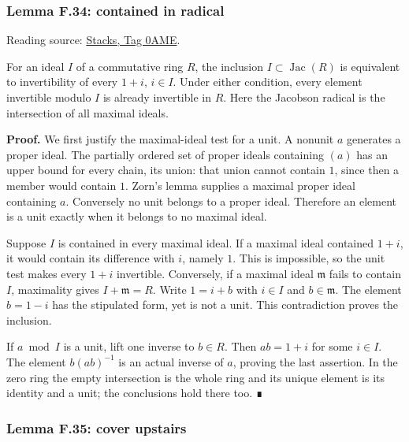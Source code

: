 \documentclass[11pt,a4paper,openany]{report}
\begin{document}
\label{AG-RG-S05-algebra-lemma-contained-in-radical}

\subsubsection{Lemma F.34: contained in radical}\label{AG-RG-S05-lemma-f.34-contained-in-radical}

Reading source: \href{https://stacks.math.columbia.edu/tag/0AME}{Stacks, Tag 0AME}.

For an ideal \(I\) of a commutative ring \(R\), the inclusion \(I\subset\operatorname{Jac}(R)\) is equivalent to invertibility of every \(1+i\), \(i\in I\). Under either condition, every element invertible modulo \(I\) is already invertible in \(R\). Here the Jacobson radical is the intersection of all maximal ideals.

\textbf{Proof.} We first justify the maximal-ideal test for a unit. A nonunit \(a\) generates a proper ideal. The partially ordered set of proper ideals containing \((a)\) has an upper bound for every chain, its union: that union cannot contain \(1\), since then a member would contain \(1\). Zorn's lemma supplies a maximal proper ideal containing \(a\). Conversely no unit belongs to a proper ideal. Therefore an element is a unit exactly when it belongs to no maximal ideal.

Suppose \(I\) is contained in every maximal ideal. If a maximal ideal contained \(1+i\), it would contain its difference with \(i\), namely \(1\). This is impossible, so the unit test makes every \(1+i\) invertible. Conversely, if a maximal ideal \(\mathfrak m\) fails to contain \(I\), maximality gives \(I+\mathfrak m=R\). Write \(1=i+b\) with \(i\in I\) and \(b\in\mathfrak m\). The element \(b=1-i\) has the stipulated form, yet is not a unit. This contradiction proves the inclusion.

If \(a\bmod I\) is a unit, lift one inverse to \(b\in R\). Then \(ab=1+i\) for some \(i\in I\). The element \(b(ab)^{-1}\) is an actual inverse of \(a\), proving the last assertion. In the zero ring the empty intersection is the whole ring and its unique element is its identity and a unit; the conclusions hold there too. ∎

\label{AG-RG-S05-algebra-lemma-cover-upstairs}

\subsubsection{Lemma F.35: cover upstairs}\label{AG-RG-S05-lemma-f.35-cover-upstairs}
\end{document}
